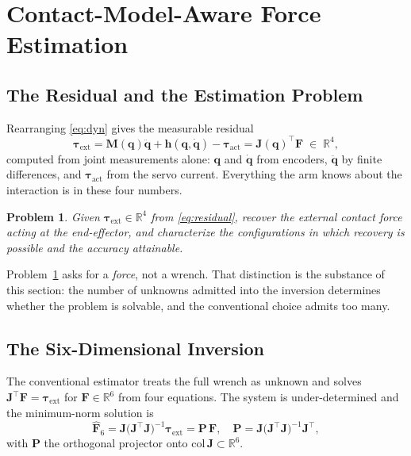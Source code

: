 \documentclass{ieeeaccess}
\newtheorem{problem}{Problem}
\newcommand{\R}{\mathbb{R}}
\newcommand{\Jfull}{\bm{J}}
\newcommand{\Pobs}{\bm{P}}
\newcommand{\tauext}{\bm{\tau}_{\mathrm{ext}}}
\newcommand{\tauact}{\bm{\tau}_{\mathrm{act}}}
\begin{document}
\section{Contact-Model-Aware Force Estimation}
\label{sec:estimation}

\subsection{The Residual and the Estimation Problem}
Rearranging \eqref{eq:dyn} gives the measurable residual
\begin{equation}
\tauext=\bm M(\bm q)\ddot{\bm q}+\bm h(\bm q,\dot{\bm q})-\tauact
=\Jfull(\bm q)^{\!\top}\bm F \;\in\;\R^{4},
\label{eq:residual}
\end{equation}
computed from joint measurements alone: $\bm q$ and $\dot{\bm q}$ from encoders,
$\ddot{\bm q}$ by finite differences, and $\tauact$ from the servo current.
Everything the arm knows about the interaction is in these four numbers.

\begin{problem}
Given $\tauext\in\R^4$ from \eqref{eq:residual}, recover the external contact
force acting at the end-effector, and characterize the configurations in which
recovery is possible and the accuracy attainable.
\label{prob:main}
\end{problem}

Problem~\ref{prob:main} asks for a \emph{force}, not a wrench. That distinction is
the substance of this section: the number of unknowns admitted into the inversion
determines whether the problem is solvable, and the conventional choice admits too
many.

\subsection{The Six-Dimensional Inversion}
The conventional estimator treats the full wrench as unknown and solves
$\Jfull^{\!\top}\bm F=\tauext$ for $\bm F\in\R^6$ from four equations. The system
is under-determined and the minimum-norm solution is
\begin{equation}
\hat{\bm F}_{6}=\Jfull\big(\Jfull^{\!\top}\Jfull\big)^{-1}\tauext=\Pobs\,\bm F,
\quad
\Pobs=\Jfull\big(\Jfull^{\!\top}\Jfull\big)^{-1}\Jfull^{\!\top},
\label{eq:sixinv}
\end{equation}
with $\Pobs$ the orthogonal projector onto $\mathrm{col}\,\Jfull\subset\R^6$.
\end{document}
